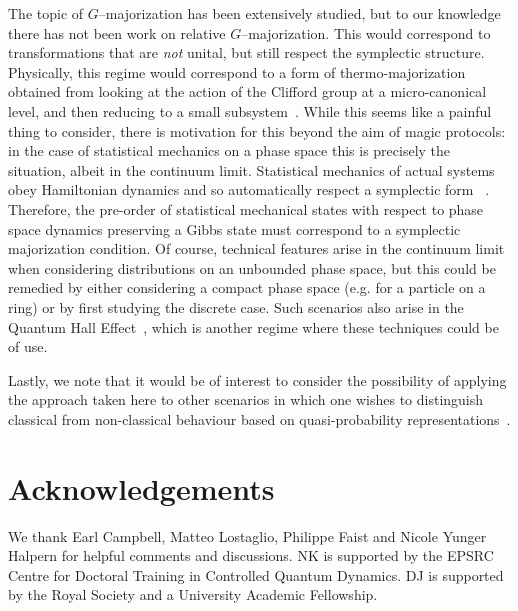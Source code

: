 \documentclass[pra,
aps,
twocolumn,
superscriptaddress,
groupedaddress,
nofootinbib,
reprint
]{revtex4-1}
\begin{document}
The topic of $G$--majorization has been extensively studied, but to our knowledge there has not been work on relative $G$--majorization. This would correspond to transformations that are \emph{not} unital, but still respect the symplectic structure. Physically, this regime would correspond to a form of thermo-majorization obtained from looking at the action of the Clifford group at a micro-canonical level, and then reducing to a small subsystem~\cite{Pathria_1997}. While this seems like a painful thing to consider, there is motivation for this beyond the aim of magic protocols: in the case of statistical mechanics on a phase space this is precisely the situation, albeit in the continuum limit. Statistical mechanics of actual systems obey Hamiltonian dynamics and so automatically respect a symplectic form~\cite{Pathria_1997} . Therefore, the pre-order of statistical mechanical states with respect to phase space dynamics preserving a Gibbs state must correspond to a symplectic majorization condition. Of course, technical features arise in the continuum limit when considering distributions on an unbounded phase space, but this could be remedied by either considering a compact phase space (e.g. for a particle on a ring) or by first studying the discrete case. Such scenarios also arise in the Quantum Hall Effect~\cite{Klitzing_1980}, which is another regime where these techniques could be of use.

Lastly, we note that it would be of interest to consider the possibility of applying the approach taken here to other scenarios in which one wishes to distinguish classical from non-classical behaviour based on quasi-probability representations~\cite{Ferrie_2008, barnett_1997,Allahverdyan_2018, arvidsson_2020, halpern_2018, Lostaglio_2018, Levy_2020}.

\vspace{1cm}
\section{Acknowledgements}
We thank Earl Campbell, Matteo Lostaglio, Philippe Faist and Nicole Yunger Halpern for helpful comments and discussions. NK is supported by the EPSRC Centre for Doctoral Training in Controlled Quantum Dynamics. DJ is supported by the Royal Society and a University Academic Fellowship.
	


%
\end{document}

